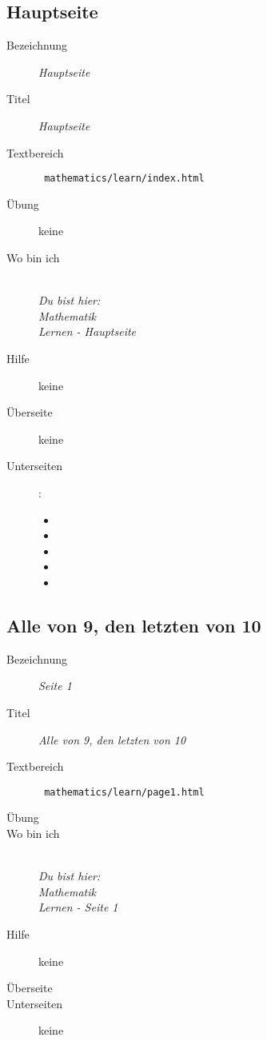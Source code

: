 \subsection{ Hauptseite }
\label{cha:math-learn-page0}
\begin{description}
  \item[Bezeichnung] \emph{ Hauptseite }
  \item[Titel] \emph{ Hauptseite }
  \item[Textbereich] \texttt{ mathematics/learn/index.html }
  \item[Übung] keine
  \item[Wo bin ich] \emph{\\Du bist hier:\\Mathematik\\Lernen - Hauptseite}
  \item[Hilfe] keine
  \item[Überseite] keine
  \item[Unterseiten] :
  \begin{itemize}
    \item {}
    \item {}
    \item {}
    \item {}
    \item {}
  \end{itemize}
\end{description}


\subsection{ Alle von 9, den letzten von 10 }
\label{cha:math-learn-page1}
\begin{description}
  \item[Bezeichnung] \emph{ Seite 1 }
  \item[Titel] \emph{ Alle von 9, den letzten von 10 }
  \item[Textbereich] \texttt{ mathematics/learn/page1.html }
  \item[Übung] 
  \item[Wo bin ich] \emph{\\Du bist hier:\\Mathematik\\Lernen - Seite 1 }
  \item[Hilfe] keine
  \item[Überseite] 
  \item[Unterseiten] keine
\end{description}



